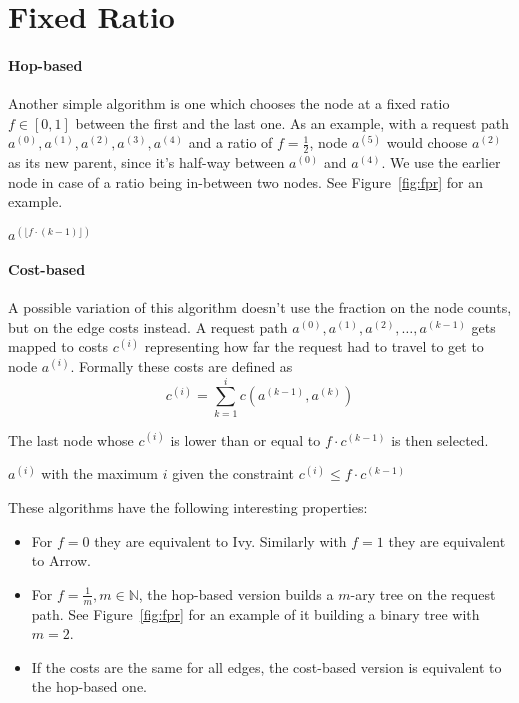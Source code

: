 \documentclass[a4paper, oneside]{discothesis}
\begin{document}
\section{Fixed Ratio}

\paragraph{Hop-based}

Another simple algorithm is one which chooses the node at a fixed ratio $f\in[0,1]$ between the first and the last one. As an example, with a request path $a^{(0)},a^{(1)},a^{(2)},a^{(3)},a^{(4)}$ and a ratio of $f=\frac{1}{2}$, node $a^{(5)}$ would choose $a^{(2)}$ as its new parent, since it's half-way between $a^{(0)}$ and $a^{(4)}$. We use the earlier node in case of a ratio being in-between two nodes. See Figure~\ref{fig:fpr} for an example.

\begin{algorithmic}
\State\Return $a^{(\lfloor f\cdot(k-1)\rfloor)}$
\EndFunction
\end{algorithmic}

\paragraph{Cost-based}

A possible variation of this algorithm doesn't use the fraction on the node counts, but on the edge costs instead. A request path $a^{(0)},a^{(1)},a^{(2)},\dots,a^{(k-1)}$ gets mapped to costs $c^{(i)}$ representing how far the request had to travel to get to node $a^{(i)}$. Formally these costs are defined as
\begin{equation}
c^{(i)}=\sum_{k=1}^ic(a^{(k-1)},a^{(k)})
\end{equation}

The last node whose $c^{(i)}$ is lower than or equal to $f\cdot c^{(k-1)}$ is then selected.

\begin{algorithmic}
\State\Return $a^{(i)}$ with the maximum $i$ given the constraint $c^{(i)}\leq f\cdot c^{(k-1)}$ 
\EndFunction
\end{algorithmic}

These algorithms have the following interesting properties:
\begin{itemize}
\item For $f=0$ they are equivalent to Ivy. Similarly with $f=1$ they are equivalent to Arrow.
\item For $f=\frac{1}{m}, m\in\mathbb{N}$, the hop-based version builds a $m$-ary tree on the request path. See Figure~\ref{fig:fpr} for an example of it building a binary tree with $m=2$.
\item If the costs are the same for all edges, the cost-based version is equivalent to the hop-based one.
\end{itemize}
\end{document}
